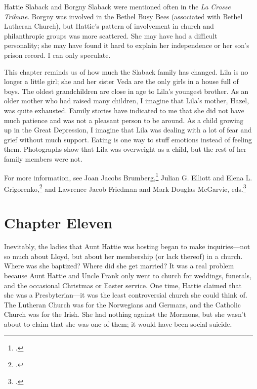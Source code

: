 \documentclass[
  american,
  letterpaper,
]{book}
\begin{document}
Hattie Slaback and Borgny Slaback were mentioned often in the \emph{La
Crosse Tribune}. Borgny was involved in the Bethel Busy Bees (associated
with Bethel Lutheran Church), but Hattie's pattern of involvement in
church and philanthropic groups was more scattered. She may have had a
difficult personality; she may have found it hard to explain her
independence or her son's prison record. I can only speculate.

This chapter reminds us of how much the Slaback family has changed. Lila
is no longer a little girl; she and her sister Veda are the only girls
in a house full of boys. The oldest grandchildren are close in age to
Lila's youngest brother. As an older mother who had raised many
children, I imagine that Lila's mother, Hazel, was quite exhausted.
Family stories have indicated to me that she did not have much patience
and was not a pleasant person to be around. As a child growing up in the
Great Depression, I imagine that Lila was dealing with a lot of fear and
grief without much support. Eating is one way to stuff emotions instead
of feeling them. Photographs show that Lila was overweight as a child,
but the rest of her family members were not.

For more information, see Joan Jacobs Brumberg,\footnote{.} Julian G. Elliott and Elena L.
Grigorenko,\footnote{.} and Lawrence Jacob
Friedman and Mark Douglas McGarvie, eds.\footnote{.}


\chapter{Chapter Eleven}\label{chapter-eleven}

Inevitably, the ladies that Aunt Hattie was hosting began to make
inquiries---not so much about Lloyd, but about her membership (or lack
thereof) in a church. Where was she baptized? Where did she get married?
It was a real problem because Aunt Hattie and Uncle Frank only went to
church for weddings, funerals, and the occasional Christmas or Easter
service. One time, Hattie claimed that she was a Presbyterian---it was
the least controversial church she could think of. The Lutheran Church
was for the Norwegians and Germans, and the Catholic Church was for the
Irish. She had nothing against the Mormons, but she wasn't about to
claim that she was one of them; it would have been social suicide.
\end{document}
